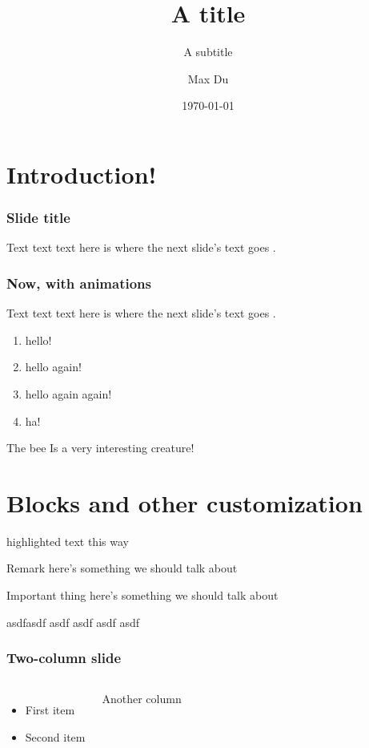 \documentclass{beamer} %
\title{A title}
\subtitle{A subtitle}
\author{Max Du}
\institute{Stanford University}
\date{\today}
\begin{document}
\frame{\titlepage} %

\section{Introduction!} %



\begin{frame} 
\frametitle{Slide title}
Text text text here is where the next slide's text goes .
\end{frame}

\begin{frame} 
\frametitle{Now, with animations }
Text text text here is where the next slide's text goes .
\begin{enumerate}
\item<1-> hello! %
\item<2-> hello again!
\item<3-> hello again again!
\item<1-> ha! %
\end{enumerate}
\end{frame}

\begin{frame} %
    The bee \pause 
    Is a \pause 
    very interesting \pause 
    creature!
\end{frame}

\section{Blocks and other customization}
\begin{frame}
    \alert{highlighted} text this way 

    \begin{block}{Remark}
        here's something we should talk about 
    \end{block}

    \begin{alertblock}{Important thing }
        here's something we should talk about 
    \end{alertblock}

    \begin{examples}
    asdfasdf asdf asdf asdf asdf 
    \end{examples}
\end{frame}

\begin{frame}
\frametitle{Two-column slide}
\begin{columns}
    \begin{itemize}
    \item First item
    \item Second item
    \end{itemize}
    Another column 
\end{columns}
\end{frame}
\end{document}
